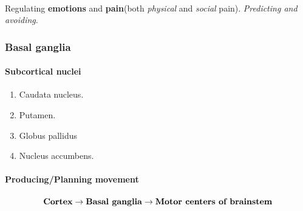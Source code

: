 \documentclass{article}
\begin{document}
	\paragraph{} Regulating \textbf{emotions} and \textbf{pain}(both \emph{physical} and \emph{social} pain). \emph{Predicting and avoiding}.
	\subsubsection{Basal ganglia}
	\paragraph{Subcortical nuclei}
	\begin{enumerate}[label=\roman*).]
		\item Caudata nucleus.
		\item Putamen.
		\item Globus pallidus
		\item Nucleus accumbens. 
	\end{enumerate}
	\paragraph{Producing/Planning movement}\[
	\text{\textbf{Cortex}} \rightarrow \text{\textbf{Basal ganglia}} \rightarrow \text{\textbf{Motor centers of brainstem}}
	\]
\end{document}
